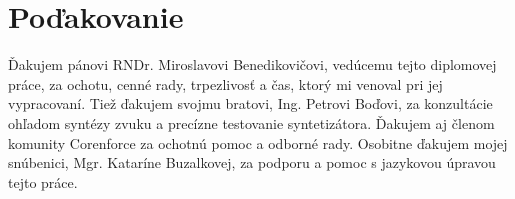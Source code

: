\thispagestyle{empty}
\vspace*{6cm}

\section*{Poďakovanie}

Ďakujem pánovi RNDr. Miroslavovi Benedikovičovi, vedúcemu tejto diplomovej práce, za ochotu, cenné rady, trpezlivosť a čas, ktorý mi venoval pri jej vypracovaní. Tiež ďakujem svojmu bratovi, Ing. Petrovi Boďovi, za konzultácie ohľadom syntézy zvuku a precízne testovanie syntetizátora. Ďakujem aj členom komunity Corenforce za ochotnú pomoc a odborné rady. Osobitne ďakujem mojej snúbenici, Mgr. Kataríne Buzalkovej, za podporu a pomoc s jazykovou úpravou tejto práce.
